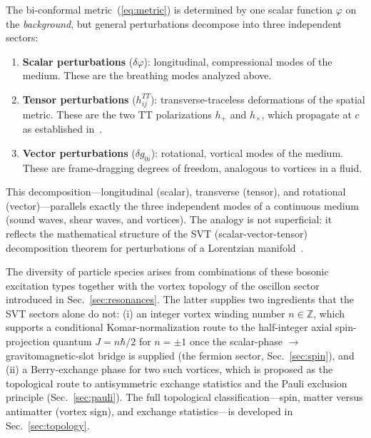 \documentclass[aps,prd,onecolumn,superscriptaddress,nofootinbib,showpacs,12pt,notitlepage]{revtex4-2}
\begin{document}
The bi-conformal metric~(\ref{eq:metric}) is determined
by one scalar function $\varphi$ on the \emph{background},
but general perturbations decompose into three independent
sectors:
\begin{enumerate}
  \item \textbf{Scalar perturbations} ($\delta\varphi$):
    longitudinal, compressional modes of the medium.
    These are the breathing modes analyzed above.
  \item \textbf{Tensor perturbations} ($h_{ij}^{TT}$):
    transverse-traceless deformations of the spatial
    metric.  These are the two TT polarizations
    $h_+$ and $h_\times$, which propagate at $c$
    as established in~\cite{Lotishvili2026}.
  \item \textbf{Vector perturbations} ($\delta g_{0i}$):
    rotational, vortical modes of the medium.  These are
    frame-dragging degrees of freedom, analogous to
    vortices in a fluid.
\end{enumerate}

This decomposition---longitudinal (scalar), transverse
(tensor), and rotational (vector)---parallels exactly
the three independent modes of a continuous medium
(sound waves, shear waves, and vortices).  The analogy
is not superficial: it reflects the mathematical structure
of the SVT (scalar-vector-tensor) decomposition theorem
for perturbations of a
Lorentzian manifold~\cite{Bardeen1980,KodamaSasaki1984}.

The diversity of particle species arises from combinations
of these bosonic excitation types together with the vortex
topology of the oscillon sector introduced in
Sec.~\ref{sec:resonances}.  The latter supplies two
ingredients that the SVT sectors alone do not: (i) an
integer vortex winding number $n\in\mathbb{Z}$, which
supports a conditional Komar-normalization route to the
half-integer axial spin-projection quantum
$J = n\hbar/2$ for $n=\pm 1$ once the scalar-phase
$\to$ gravitomagnetic-slot bridge is supplied (the
fermion sector, Sec.~\ref{sec:spin}), and (ii) a
Berry-exchange phase for two such vortices, which is
proposed as the topological route to antisymmetric
exchange statistics and the Pauli exclusion principle
(Sec.~\ref{sec:pauli}).
The full topological classification---spin, matter versus
antimatter (vortex sign), and exchange statistics---is
developed in Sec.~\ref{sec:topology}.
\end{document}

